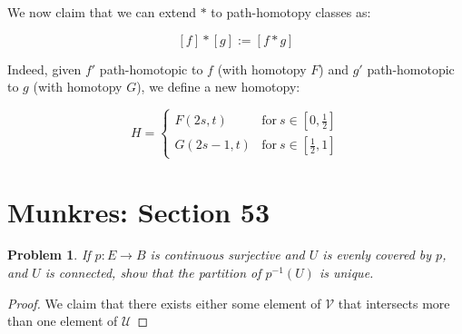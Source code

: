 \documentclass[10pt, oneside]{amsart}
\newtheorem{prob}{Problem}
\begin{document}
    We now claim that we can extend $*$ to path-homotopy classes as:

    $$[f] * [g] := [f * g]$$

    Indeed, given $f'$ path-homotopic to $f$ (with homotopy $F$) and $g'$ path-homotopic to $g$ (with homotopy $G$), we define a new homotopy:

    $$H = \begin{cases}
      F(2s, t) & \text{for} \ s \in \left[ 0, \frac{1}{2} \right] \\
      G(2s - 1, t) & \text{for} \ s \in \left[ \frac{1}{2}, 1 \right]
    \end{cases}
    $$


    \section{Munkres: Section 53}

    \begin{prob}
      If $p : E \rightarrow B$ is continuous surjective and $U$ is evenly covered by $p$, and $U$ is connected, show that the partition of $p^{-1}(U)$ is unique.
    \end{prob}

    \begin{proof}
      We claim that there exists either some element of $\mathcal{V}$ that intersects more than one element of $\mathcal{U}$
    \end{proof}
\end{document}
